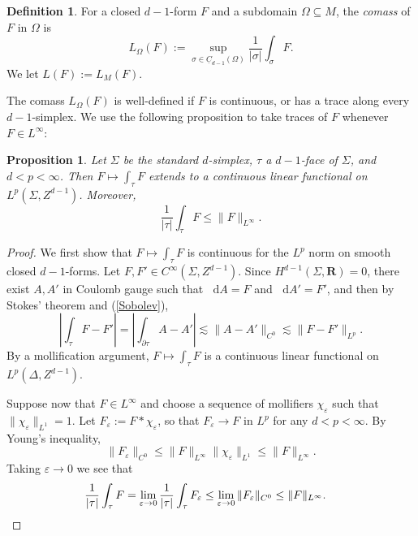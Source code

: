 \documentclass[reqno,11pt]{amsart}
\newcommand{\RR}{\mathbf{R}}
\newcommand*\dif{\mathop{}\!\mathrm{d}}
\newcommand{\Chain}{\underline C}
\newcommand{\dfn}[1]{\emph{#1}\index{#1}}
\newtheorem{proposition}[theorem]{Proposition}
\theoremstyle{definition}
\newtheorem{definition}[theorem]{Definition}
\numberwithin{equation}{section}
\begin{document}
\begin{definition}
For a closed $d-1$-form $F$ and a subdomain $\Omega \subseteq M$, the \dfn{comass} of $F$ in $\Omega$ is
$$L_\Omega(F) := \sup_{\sigma \in \Chain_{d - 1}(\Omega)} \frac{1}{|\sigma|} \int_\sigma F.$$
We let $L(F) := L_M(F)$.
\end{definition}

The comass $L_\Omega(F)$ is well-defined if $F$ is continuous, or has a trace along every $d - 1$-simplex.
We use the following proposition to take traces of $F$ whenever $F \in L^\infty$:

\begin{proposition}\label{integration is welldefined}
Let $\Sigma$ be the standard $d$-simplex, $\tau$ a $d-1$-face of $\Sigma$, and $d < p < \infty$.
Then $F \mapsto \int_\tau F$ extends to a continuous linear functional on $L^p(\Sigma, Z^{d - 1})$.
Moreover,
\begin{equation}\label{integral over chain is linfinity}
	\frac{1}{|\tau|} \int_\tau F \leq \|F\|_{L^\infty}.
\end{equation}
\end{proposition}
\begin{proof}
We first show that $F \mapsto \int_\tau F$ is continuous for the $L^p$ norm on smooth closed $d-1$-forms.
Let $F, F' \in C^\infty(\Sigma, Z^{d - 1})$.
Since $H^{d - 1}(\Sigma, \RR) = 0$, there exist $A, A'$ in Coulomb gauge such that $\dif A = F$ and $\dif A' = F'$, and then by Stokes' theorem and (\ref{Sobolev}),
$$\left|\int_\tau F - F'\right| = \left|\int_{\partial \tau} A - A'\right| \lesssim \|A - A'\|_{C^0} \lesssim \|F - F'\|_{L^p}.$$
By a mollification argument, $F \mapsto \int_\tau F$ is a continuous linear functional on $L^p(\Delta, Z^{d - 1})$.

Suppose now that $F \in L^\infty$ and choose a sequence of mollifiers $\chi_\varepsilon$ such that $\|\chi_\varepsilon\|_{L^1} = 1$.
Let $F_\varepsilon := F * \chi_\varepsilon$, so that $F_\varepsilon \to F$ in $L^p$ for any $d < p < \infty$.
By Young's inequality, 
$$\|F_\varepsilon\|_{C^0} \leq \|F\|_{L^\infty} \|\chi_\varepsilon\|_{L^1} \leq \|F\|_{L^\infty}.$$
Taking $\varepsilon \to 0$ we see that
\begin{align*}
\frac{1}{|\tau|} \int_\tau F 
&= \lim_{\varepsilon \to 0} \frac{1}{|\tau|} \int_\tau F_\varepsilon \leq \lim_{\varepsilon \to 0} \|F_\varepsilon\|_{C^0} \leq \|F\|_{L^\infty}. \qedhere
\end{align*}
\end{proof}
\end{document}
